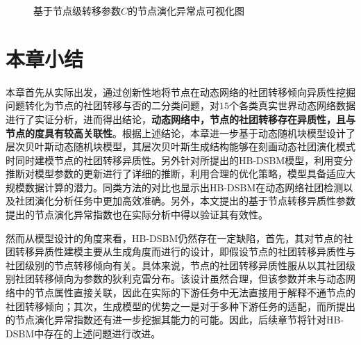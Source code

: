 \begin{figure}
	\centering
	\caption{基于节点级转移参数$C$的节点演化异常点可视化图}
	\label{fig:anomalyPics}
\end{figure}


\section{本章小结}
本章首先从实际出发，通过创新性地将节点在动态网络的社团转移倾向异质性挖掘问题转化为节点的社团转移与否的二分类问题，对$15$个各类真实世界动态网络数据进行了实证分析，进而得出结论，\textbf{动态网络中，节点的社团转移存在异质性，且与节点的度具有较高关联性}。根据上述结论，本章进一步基于动态随机块模型设计了层次贝叶斯动态随机块模型，其层次贝叶斯生成结构能够在刻画动态社团演化模式时同时建模节点的社团转移异质性。另外针对所提出的HB-DSBM模型，利用变分推断对模型参数的更新进行了详细的推断，利用合理的优化策略，模型具备适应大规模数据计算的潜力。同类方法的对比也显示出HB-DSBM在动态网络社团检测以及社团演化分析任务中更加高效准确。另外，本文提出的基于节点转移异质性参数提出的节点演化异常指数也在实际分析中得以验证其有效性。

然而从模型设计的角度来看，HB-DSBM仍然存在一定缺陷，首先，其对节点的社团转移异质性建模主要从生成角度而进行的设计，即假设节点的社团转移异质性与社团级别的节点转移倾向有关。具体来说，节点的社团转移异质性服从以其社团级别社团转移倾向为参数的狄利克雷分布。该设计虽然合理，但该参数并未与动态网络中的节点属性直接关联，因此在实际的下游任务中无法直接用于解释不通节点的社团转移倾向；其次，生成模型的优势之一是对于多种下游任务的适配，而所提出的节点演化异常指数还有进一步挖掘其能力的可能。因此，后续章节将针对HB-DSBM中存在的上述问题进行改进。











